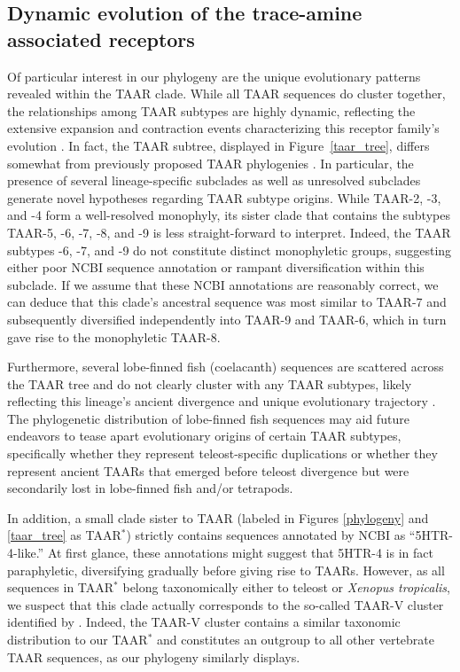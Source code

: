 \documentclass[fleqn,10pt]{wlpeerj}
\begin{document}
\subsection*{Dynamic evolution of the trace-amine associated receptors}
Of particular interest in our phylogeny are the unique evolutionary patterns revealed within the TAAR clade. While all TAAR sequences do cluster together, the relationships among TAAR subtypes are highly dynamic, reflecting the extensive expansion and contraction events characterizing this receptor family's evolution \citep{Lindemann2005,Hashiguchi2007,Staubert2010,Staubert2013}. In fact, the TAAR subtree, displayed in Figure~\ref{taar_tree}, differs somewhat from previously proposed TAAR phylogenies \citep{Lindemann2005, Hashiguchi2007}. In particular, the presence of several lineage-specific subclades as well as unresolved subclades generate novel hypotheses regarding TAAR subtype origins. While TAAR-2, -3, and -4 form a well-resolved monophyly, its sister clade that contains the subtypes TAAR-5, -6, -7, -8, and -9 is less straight-forward to interpret. Indeed, the TAAR subtypes -6, -7, and -9 do not constitute distinct monophyletic groups, suggesting either poor NCBI sequence annotation or rampant diversification within this subclade. If we assume that these NCBI annotations are reasonably correct, we can deduce that this clade's ancestral sequence was most similar to TAAR-7 and subsequently diversified independently into TAAR-9 and TAAR-6, which in turn gave rise to the monophyletic TAAR-8. 

Furthermore, several lobe-finned fish (coelacanth) sequences are scattered across the TAAR tree and do not clearly cluster with any TAAR subtypes, likely reflecting this lineage's ancient divergence and unique evolutionary trajectory \citep{coelacanth2013}. The phylogenetic distribution of lobe-finned fish sequences may aid future endeavors to tease apart evolutionary origins of certain TAAR subtypes, specifically whether they represent teleost-specific duplications \citep{Gloriametal2005} or whether they represent ancient TAARs that emerged before teleost divergence but were secondarily lost in lobe-finned fish and/or tetrapods.

In addition, a small clade sister to TAAR (labeled in Figures \ref{phylogeny} and \ref{taar_tree} as TAAR$^\ast$) strictly contains sequences annotated by NCBI as ``5HTR-4-like.'' At first glance, these annotations might suggest that 5HTR-4 is in fact paraphyletic, diversifying gradually before giving rise to TAARs. However, as all sequences in TAAR$^\ast$ belong taxonomically either to teleost or \emph{Xenopus tropicalis}, we suspect that this clade actually corresponds to the so-called TAAR-V cluster identified by \cite{Hashiguchi2007}. Indeed, the TAAR-V cluster contains a similar taxonomic distribution to our TAAR$^\ast$ and constitutes an outgroup to all other vertebrate TAAR sequences, as our phylogeny similarly displays.
\end{document}
